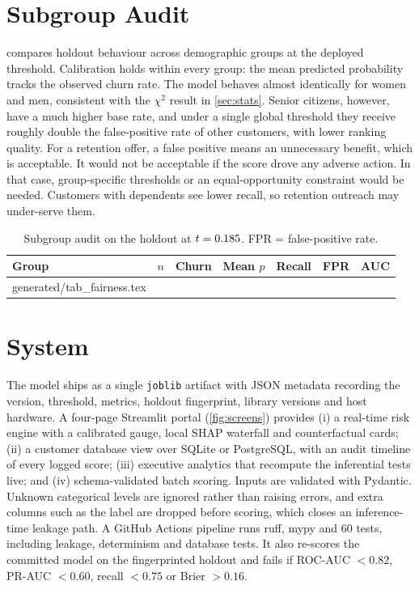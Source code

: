 \documentclass[conference]{IEEEtran}
\makeatletter
\newcommand{\genrows}[1]{\@@input generated/#1.tex }
\newcommand{\code}[1]{\texttt{#1}}
\makeatother
\begin{document}
\section{Subgroup Audit}
\label{sec:fairness}

 compares holdout behaviour across demographic groups at the deployed
threshold. Calibration holds within every group: the mean predicted probability tracks the
observed churn rate. The model behaves almost identically for women and men, consistent with
the $\chi^2$ result in \cref{sec:stats}. Senior citizens, however, have a much higher base rate,
and under a single global threshold they receive roughly double the false-positive rate of other
customers, with lower ranking quality. For a retention offer, a false positive means an
unnecessary benefit, which is acceptable. It would not be acceptable if the score drove any
adverse action. In that case, group-specific thresholds or an equal-opportunity constraint
\cite{hardt2016equality} would be needed. Customers with dependents see lower recall, so
retention outreach may under-serve them.

\begin{table}[t]
\centering
\caption{Subgroup audit on the holdout at $t=0.185$. FPR = false-positive rate.}
\label{tab:fairness}
\footnotesize
\setlength{\tabcolsep}{3.6pt}
\begin{tabular}{@{}l r r r r r r@{}}
\toprule
\textbf{Group} & $n$ & \textbf{Churn} & \textbf{Mean $p$} & \textbf{Recall} & \textbf{FPR} & \textbf{AUC}\\
\midrule
\genrows{tab_fairness}
\bottomrule
\end{tabular}
\end{table}

\section{System}
\label{sec:system}

The model ships as a single \code{joblib} artifact with JSON metadata recording the version,
threshold, metrics, holdout fingerprint, library versions and host hardware. A four-page
Streamlit portal (\cref{fig:screens}) provides (i) a real-time risk engine with a calibrated
gauge, local SHAP waterfall and counterfactual cards; (ii) a customer database view over
SQLite or PostgreSQL, with an audit timeline of every logged score; (iii) executive analytics
that recompute the inferential tests live; and (iv) schema-validated batch scoring.
Inputs are validated with Pydantic. Unknown categorical levels are ignored rather than raising
errors, and extra columns such as the label are dropped before scoring, which closes an
inference-time leakage path. A GitHub Actions pipeline runs ruff, mypy and 60
tests, including leakage, determinism and database tests. It also re-scores the committed model
on the fingerprinted holdout and fails if ROC-AUC $<0.82$, PR-AUC $<0.60$, recall $<0.75$ or
Brier $>0.16$.
\end{document}

